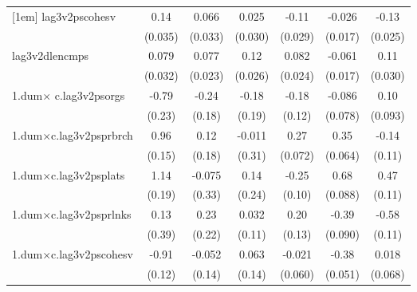 \begin{table}[htbp]
\begin{tabular}{l*{6}{c}}
[1em]
lag3v2pscohesv&        0.14\sym{***}&       0.066\sym{*}  &       0.025         &       -0.11\sym{***}&      -0.026         &       -0.13\sym{***}\\
            &     (0.035)         &     (0.033)         &     (0.030)         &     (0.029)         &     (0.017)         &     (0.025)         \\
[1em]
lag3v2dlencmps&       0.079\sym{*}  &       0.077\sym{***}&        0.12\sym{***}&       0.082\sym{***}&      -0.061\sym{***}&        0.11\sym{***}\\
            &     (0.032)         &     (0.023)         &     (0.026)         &     (0.024)         &     (0.017)         &     (0.030)         \\
[1em]
1.dum$\times$ c.lag3v2psorgs&       -0.79\sym{***}&       -0.24         &       -0.18         &       -0.18         &      -0.086         &        0.10         \\
            &      (0.23)         &      (0.18)         &      (0.19)         &      (0.12)         &     (0.078)         &     (0.093)         \\
[1em]
1.dum$\times$c.lag3v2psprbrch&        0.96\sym{***}&        0.12         &      -0.011         &        0.27\sym{***}&        0.35\sym{***}&       -0.14         \\
            &      (0.15)         &      (0.18)         &      (0.31)         &     (0.072)         &     (0.064)         &      (0.11)         \\
[1em]
1.dum$\times$c.lag3v2psplats&        1.14\sym{***}&      -0.075         &        0.14         &       -0.25\sym{*}  &        0.68\sym{***}&        0.47\sym{***}\\
            &      (0.19)         &      (0.33)         &      (0.24)         &      (0.10)         &     (0.088)         &      (0.11)         \\
[1em]
1.dum$\times$c.lag3v2psprlnks&        0.13         &        0.23         &       0.032         &        0.20         &       -0.39\sym{***}&       -0.58\sym{***}\\
            &      (0.39)         &      (0.22)         &      (0.11)         &      (0.13)         &     (0.090)         &      (0.11)         \\
[1em]
1.dum$\times$c.lag3v2pscohesv&       -0.91\sym{***}&      -0.052         &       0.063         &      -0.021         &       -0.38\sym{***}&       0.018         \\
            &      (0.12)         &      (0.14)         &      (0.14)         &     (0.060)         &     (0.051)         &     (0.068)         \\

\end{tabular}
\end{table}
